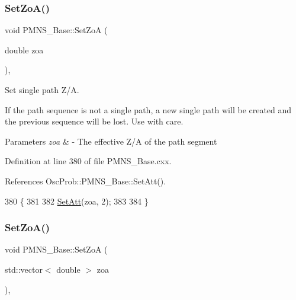 \subsubsection{\texorpdfstring{Set\+Zo\+A()}{SetZoA()}\hspace{0.1cm}{\footnotesize\ttfamily [1/2]}}
{\footnotesize\ttfamily void P\+M\+N\+S\+\_\+\+Base\+::\+Set\+ZoA (\begin{DoxyParamCaption}\item[{double}]{zoa }\end{DoxyParamCaption})\hspace{0.3cm}{\ttfamily [virtual]}, {\ttfamily [inherited]}}

Set single path Z/A.

If the path sequence is not a single path, a new single path will be created and the previous sequence will be lost. Use with care.


\begin{DoxyParams}{Parameters}
{\em zoa} & -\/ The effective Z/A of the path segment \\
\hline
\end{DoxyParams}


Definition at line 380 of file P\+M\+N\+S\+\_\+\+Base.\+cxx.



References Osc\+Prob\+::\+P\+M\+N\+S\+\_\+\+Base\+::\+Set\+Att().


\begin{DoxyCode}
380                                 \{
381 
382   \hyperlink{classOscProb_1_1PMNS__Base_aba565962a440d14bee7a2a96d2eca2c5}{SetAtt}(zoa, 2);
383 
384 \}
\end{DoxyCode}
\mbox{\label{classOscProb_1_1PMNS__Base_a8495f8a320e1a21965e6a64aec92ad2a}} 
\subsubsection{\texorpdfstring{Set\+Zo\+A()}{SetZoA()}\hspace{0.1cm}{\footnotesize\ttfamily [2/2]}}
{\footnotesize\ttfamily void P\+M\+N\+S\+\_\+\+Base\+::\+Set\+ZoA (\begin{DoxyParamCaption}\item[{std\+::vector$<$ double $>$}]{zoa }\end{DoxyParamCaption})\hspace{0.3cm}{\ttfamily [virtual]}, {\ttfamily [inherited]}}

